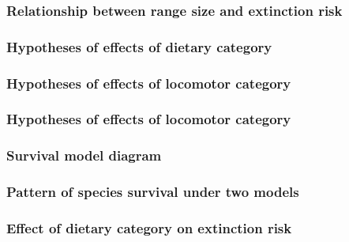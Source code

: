\documentclass{beamer}
\begin{document}
\begin{frame}
  \frametitle{Relationship between range size and extinction risk}
  \begin{center}
  \end{center}

  \tiny{}
\end{frame}


\begin{frame}
  \frametitle{Hypotheses of effects of dietary category}
  \begin{center}
  \end{center}
\end{frame}

\begin{frame}
  \frametitle{Hypotheses of effects of locomotor category}
  \begin{center}
  \end{center}
\end{frame}

\begin{frame}
  \frametitle{Hypotheses of effects of locomotor category}
  \begin{center}
  \end{center}
\end{frame}

\begin{frame}
  \frametitle{Survival model diagram}
  \begin{center}
  \end{center}
\end{frame}

\begin{frame}
  \frametitle{Pattern of species survival under two models}

\end{frame}

\begin{frame}
  \frametitle{Effect of dietary category on extinction risk}

\end{frame}
\end{document}
